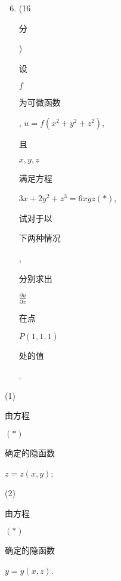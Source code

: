 \documentclass[10pt]{article}
\begin{document}
\begin{enumerate}
  \setcounter{enumi}{5}
  \item (16 \begin{CJK}{UTF8}{mj}分\end{CJK}) \begin{CJK}{UTF8}{mj}设\end{CJK} $f$ \begin{CJK}{UTF8}{mj}为可微函数\end{CJK}, $u=f\left(x^{2}+y^{2}+z^{2}\right)$, \begin{CJK}{UTF8}{mj}且\end{CJK} $x, y, z$ \begin{CJK}{UTF8}{mj}满足方程\end{CJK} $3 x+2 y^{2}+z^{3}=6 x y z(*)$, \begin{CJK}{UTF8}{mj}试对于以\end{CJK} \begin{CJK}{UTF8}{mj}下两种情况\end{CJK}, \begin{CJK}{UTF8}{mj}分别求出\end{CJK} $\frac{\partial u}{\partial x}$ \begin{CJK}{UTF8}{mj}在点\end{CJK} $P(1,1,1)$ \begin{CJK}{UTF8}{mj}处的值\end{CJK}.
\end{enumerate}
(1) \begin{CJK}{UTF8}{mj}由方程\end{CJK} $(*)$ \begin{CJK}{UTF8}{mj}确定的隐函数\end{CJK} $z=z(x, y)$;

(2) \begin{CJK}{UTF8}{mj}由方程\end{CJK} $(*)$ \begin{CJK}{UTF8}{mj}确定的隐函数\end{CJK} $y=y(x, z)$.
\end{document}
